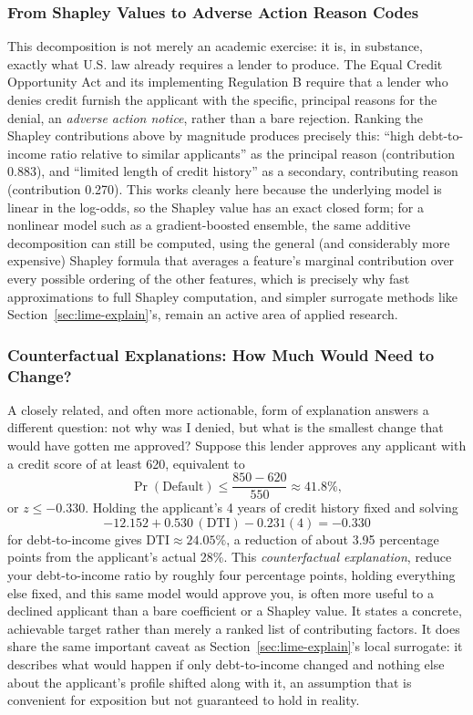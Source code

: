 \documentclass[../ai_in_finance]{subfiles}
\begin{document}
\subsubsection*{From Shapley Values to Adverse Action Reason Codes}
\label{sec:adverse-action}

This decomposition is not merely an academic exercise: it is, in substance, exactly what U.S. law already requires a lender to produce. The Equal Credit Opportunity Act and its implementing Regulation B require that a lender who denies credit furnish the applicant with the specific, principal reasons for the denial, an \emph{adverse action notice}, rather than a bare rejection. Ranking the Shapley contributions above by magnitude produces precisely this: ``high debt-to-income ratio relative to similar applicants'' as the principal reason (contribution 0.883), and ``limited length of credit history'' as a secondary, contributing reason (contribution 0.270). This works cleanly here because the underlying model is linear in the log-odds, so the Shapley value has an exact closed form; for a nonlinear model such as a gradient-boosted ensemble, the same additive decomposition can still be computed, using the general (and considerably more expensive) Shapley formula that averages a feature's marginal contribution over every possible ordering of the other features, which is precisely why fast approximations to full Shapley computation, and simpler surrogate methods like Section~\ref{sec:lime-explain}'s, remain an active area of applied research.

\subsubsection*{Counterfactual Explanations: How Much Would Need to Change?}
\label{sec:counterfactual}

A closely related, and often more actionable, form of explanation answers a different question: not why was I denied, but what is the smallest change that would have gotten me approved? Suppose this lender approves any applicant with a credit score of at least 620, equivalent to
$$\Pr(\text{Default}) \le \frac{850-620}{550} \approx 41.8\%,$$
or $z \le -0.330$. Holding the applicant's 4 years of credit history fixed and solving
$$-12.152 + 0.530\,(\text{DTI}) - 0.231(4) = -0.330$$
for debt-to-income gives $\text{DTI} \approx 24.05\%$, a reduction of about 3.95 percentage points from the applicant's actual 28\%. This \emph{counterfactual explanation}, reduce your debt-to-income ratio by roughly four percentage points, holding everything else fixed, and this same model would approve you, is often more useful to a declined applicant than a bare coefficient or a Shapley value. It states a concrete, achievable target rather than merely a ranked list of contributing factors. It does share the same important caveat as Section~\ref{sec:lime-explain}'s local surrogate: it describes what would happen if only debt-to-income changed and nothing else about the applicant's profile shifted along with it, an assumption that is convenient for exposition but not guaranteed to hold in reality.
\end{document}
